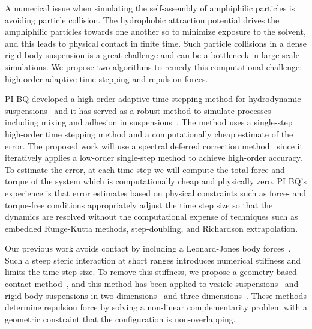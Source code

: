 A numerical issue when simulating the self-assembly of amphiphilic
particles is avoiding particle collision. The hydrophobic attraction
potential drives the amphiphilic particles towards one another so to
minimize exposure to the solvent, and this leads to physical contact in
finite time. Such particle collisions in a dense rigid body suspension
is a great challenge and can be a bottleneck in large-scale simulations.
We propose two algorithms to remedy this computational challenge:
high-order adaptive time stepping and repulsion forces.

PI BQ developed a high-order adaptive time stepping method for
hydrodynamic suspensions~\cite{qua-bir2016} and it has served as a
robust method to simulate processes including mixing and adhesion in
suspensions~\cite{qua-vee-you2019, kab-qua-bir2017}. The method uses
a single-step high-order time stepping method and a computationally
cheap estimate of the error. The proposed work will use a spectral
deferred correction method~\cite{dut-gre-rok2000} since it iteratively
applies a low-order single-step method to achieve high-order accuracy.
To estimate the error, at each time step we will compute the total force
and torque of the system which is computationally cheap and physically
zero. PI BQ's experience is that error estimates based on physical
constraints such as force- and torque-free conditions appropriately
adjust the time step size so that the dynamics are resolved without the
computational expense of techniques such as embedded Runge-Kutta
methods, step-doubling, and Richardson extrapolation.

Our previous work avoids contact by including a Leonard-Jones body
forces~\cite{Fu2018_SIAM}. Such a steep steric interaction at short
ranges introduces numerical stiffness and limits the time step size. To
remove this stiffness, we propose a geometry-based contact
method~\cite{har-pon-sor-zor2011}, and this method has been applied to
vesicle suspensions~\cite{lu-rah-zor2017} and rigid body suspensions in
two dimensions~\cite{bys-sha-qua2020} and three
dimensions~\cite{Yan2019}. These methods determine repulsion force by
solving a non-linear complementarity problem with a geometric constraint
that the configuration is non-overlapping.


